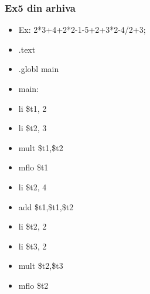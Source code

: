 \documentclass[pdf]{beamer}
\begin{document}
\begin{frame}[shrink=10]
\frametitle{Ex5 din arhiva}
\begin{itemize}
\item
Ex: 2*3+4+2*2-1-5+2+3*2-4/2+3;
\item \vspace{5mm}
	.text
\item \quad
	.globl main
\item
main:
\item \quad
	li \hspace{10mm} \$t1, 2
\item \quad
	li \hspace{10mm} \$t2, 3
\item \quad
	mult \hspace{4.5mm} \$t1,\$t2
\item \quad
	mflo \hspace{4.7mm} \$t1
\item \quad \vspace{5mm}
	li \hspace{10mm} \$t2, 4
\item \quad
	add \hspace{6mm} \$t1,\$t1,\$t2
\item \quad \vspace{5mm}
	li \hspace{10mm} \$t2, 2
\item \quad
	li \hspace{10mm} \$t3, 2
\item \quad
	mult \hspace{4.5mm} \$t2,\$t3
\item \quad
	mflo \hspace{4.7mm} \$t2
\end{itemize}
\end{frame}
\end{document}
